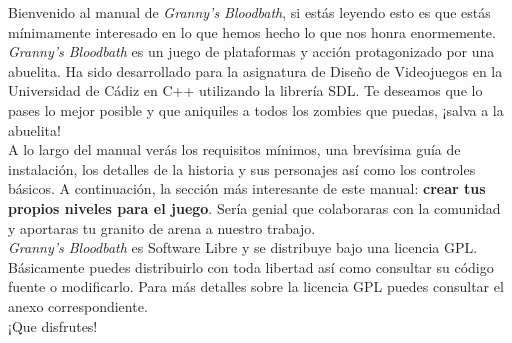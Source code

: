 Bienvenido al manual de \emph{Granny's Bloodbath}, si estás leyendo esto es que estás mínimamente interesado en lo que hemos hecho lo que nos honra enormemente. \emph{Granny's Bloodbath} es un juego de plataformas y acción protagonizado por una abuelita. Ha sido desarrollado para la asignatura de Diseño de Videojuegos en la Universidad de Cádiz en C++ utilizando la librería SDL. Te deseamos que lo pases lo mejor posible y que aniquiles a todos los zombies que puedas, ¡salva a la abuelita!\\

A lo largo del manual verás los requisitos mínimos, una brevísima guía de instalación, los detalles de la historia y sus personajes así como los controles básicos. A continuación, la sección más interesante de este manual: \textbf{crear tus propios niveles para el juego}. Sería genial que colaboraras con la comunidad y aportaras tu granito de arena a nuestro trabajo.\\

\emph{Granny's Bloodbath} es Software Libre y se distribuye bajo una licencia GPL. Básicamente puedes distribuirlo con toda libertad así como consultar su código fuente o modificarlo. Para más detalles sobre la licencia GPL puedes consultar el anexo correspondiente.\\

¡Que disfrutes!
